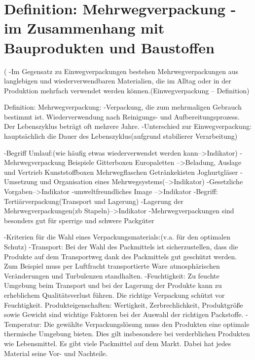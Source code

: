 



\section{Definition: Mehrwegverpackung - im Zusammenhang mit
Bauprodukten und Baustoffen}
\label{sec:Definitionen:Mehrwegverpackung im Zusammenhang mit Bauprodukten und Baustoffen}

(%
-Im Gegensatz zu Einwegverpackungen bestehen Mehrwegverpackungen aus langlebigen und wiederverwendbaren Materialien, die im Alltag oder in der Produktion mehrfach verwendet werden können.(Einwegverpackung – Definition)


Definition: Mehrwegverpackung: 
-Verpackung, die zum mehrmaligen Gebrauch bestimmt ist. Wiederverwendung nach Reinigungs- und Aufbereitungsprozess. Der Lebenszyklus beträgt oft mehrere Jahre. 
-Unterschied zur Einwegverpackung: hauptsächlich die Dauer des Lebenszyklus(aufgrund stabilierer Verarbeitung)


-Begriff Umlauf:(wie häufig etwas wiederverwendet werden kann-->Indikator)
-Mehrwegverpackung Beispiele
    Gitterboxen
    Europaletten -->Beladung, Auslage und Vertrieb
    Kunststoffboxen
    Mehrwegflaschen
    Getränkekisten
    Joghurtgläser
-Umsetzung und Organisation eines Mehrwegsystems(-->Indikator)
-Gesetzliche Vorgaben-->Indikator
-umweltfreundliches Image -->Indikator
-Begriff: Tertiärverpackung(Transport und Lagerung)
-Lagerung der Mehrwegverpackungen(zb Stapeln)-->Indikator
-Mehrwegverpackungen sind besonders gut für sperrige und schwere Packgüter


-Kriterien für die Wahl eines Verpackungsmaterials:(v.a. für den optimalen Schutz) %
    -Transport: Bei der Wahl des Packmittels ist sicherzustellen, dass die Produkte auf dem Transportweg dank des Packmittels gut geschützt werden. Zum Beispiel muss per Luftfracht transportierte Ware atmosphärischen Veränderungen und Turbulenzen standhalten.
    -Feuchtigkeit: Zu feuchte Umgebung beim Transport und bei der Lagerung der Produkte kann zu erheblichem Qualitätsverlust führen. Die richtige Verpackung schützt vor Feuchtigkeit.
    Produkteigenschaften: Wertigkeit, Zerbrechlichkeit, Produktgröße sowie Gewicht sind wichtige Faktoren bei der Auswahl der richtigen Packstoffe.
    -Temperatur: Die gewählte Verpackungslösung muss den Produkten eine optimale thermische Umgebung bieten. Dies gilt insbesondere bei verderblichen Produkten wie Lebensmittel.
    Es gibt viele Packmittel auf dem Markt. Dabei hat jedes Material seine Vor- und Nachteile.

